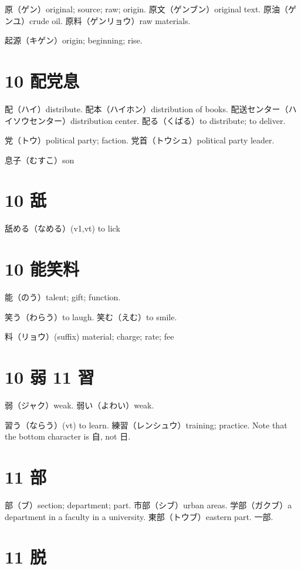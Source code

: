 原（ゲン）original; source; raw; origin.
原文（ゲンブン）original text.
原油（ゲンユ）crude oil.
原料（ゲンリョウ）raw materials.

起源（キゲン）origin; beginning; rise.

\section{10 配党息}

配（ハイ）distribute.
配本（ハイホン）distribution of books.
配送センター（ハイソウセンター）distribution center.
配る（くばる）to distribute; to deliver.

党（トウ）political party; faction.
党首（トウシュ）political party leader.

息子（むすこ）son

\section{10 舐}

舐める（なめる）(v1,vt) to lick

\section{10 能笑料}

能（のう）talent; gift; function.

笑う（わらう）to laugh.
笑む（えむ）to smile.

料（リョウ）(suffix) material; charge; rate; fee

\section{10 弱 11 習}

弱（ジャク）weak.
弱い（よわい）weak.

習う（ならう）(vt) to learn.
練習（レンシュウ）training; practice.
Note that the bottom character is 自, not 日.

\section{11 部}

部（ブ）section; department; part.
市部（シブ）urban areas.
学部（ガクブ）a department in a faculty in a university.
東部（トウブ）eastern part.
一部.

\section{11 脱}

